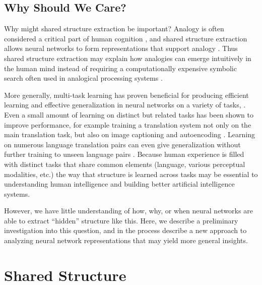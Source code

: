 \documentclass[10pt,letterpaper]{article}
\begin{document}
\subsection{Why Should We Care?}
Why might shared structure extraction be important? Analogy is often considered a critical part of human cognition \cite[e.g.]{Gentner2003}, and shared structure extraction allows neural networks to form representations that support analogy \citep{Pennington2014,Kollias2013}. Thus shared structure extraction may explain how analogies can emerge intuitively in the human mind instead of requiring a computationally expensive symbolic search often used in analogical processing systems \cite[e.g.]{Falkenhainer1989}.  \par
More generally, multi-task learning has proven beneficial for producing efficient learning and effective generalization in neural networks on a variety of tasks, \cite[e.g.]{Dong2015,Rusu2015}. Even a small amount of learning on distinct but related tasks has been shown to improve performance, for example training a translation system not only on the main translation task, but also on image captioning and autoencoding \citep{Luong2016}. Learning on numerous language translation pairs can even give generalization without further training to unseen language pairs \citep{Johnson2016}. Because human experience is filled with distinct tasks that share common elements (language, various perceptual modalities, etc.) the way that structure is learned across tasks may be essential to understanding human intelligence and building better artificial intelligence systems.\par
However, we have little understanding of how, why, or when neural networks are able to extract ``hidden'' structure like this. Here, we describe a preliminary investigation into this question, and in the process describe a new approach to analyzing neural network representations that may yield more general insights. 
\section{Shared Structure}
\end{document}
